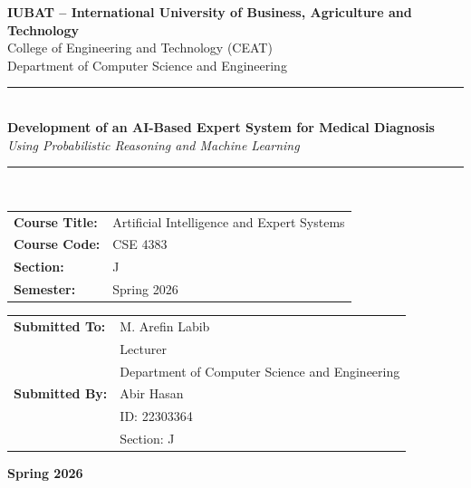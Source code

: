 \documentclass[12pt,a4paper]{article}
\begin{document}
\begin{titlepage}
\centering

\vspace*{1cm}

{\Large \textbf{\color{darkblue}IUBAT -- International University of Business, Agriculture and Technology}}\\[0.4cm]
{\normalsize College of Engineering and Technology (CEAT)}\\[0.1cm]
{\normalsize Department of Computer Science and Engineering}\\[1.5cm]

\rule{\linewidth}{0.5pt}\\[0.5cm]

{\LARGE \textbf{Development of an AI-Based Expert System for Medical Diagnosis}}\\[0.4cm]
{\Large \textit{Using Probabilistic Reasoning and Machine Learning}}\\[0.3cm]

\rule{\linewidth}{0.5pt}\\[1.5cm]

\begin{tabular}{ll}
\textbf{Course Title:} & Artificial Intelligence and Expert Systems \\[0.3cm]
\textbf{Course Code:} & CSE 4383 \\[0.3cm]
\textbf{Section:}     & J \\[0.3cm]
\textbf{Semester:}    & Spring 2026 \\
\end{tabular}

\vspace{1.5cm}

\begin{tabular}{ll}
\textbf{Submitted To:} & M. Arefin Labib \\[0.2cm]
                       & Lecturer \\[0.2cm]
                       & Department of Computer Science and Engineering \\[0.8cm]
\textbf{Submitted By:} & Abir Hasan \\[0.2cm]
                       & ID: 22303364 \\[0.2cm]
                       & Section: J \\
\end{tabular}

\vfill
{\large \textbf{Spring 2026}}

\end{titlepage}
\end{document}
